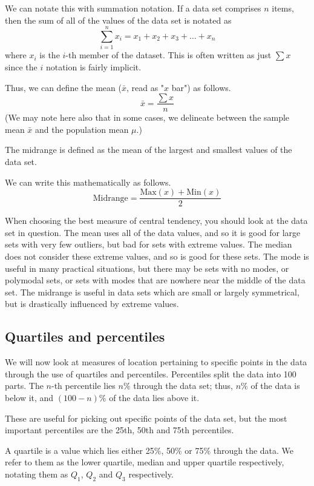We can notate this with summation notation. If a data set comprises $n$ items, then the sum of all of the values of the data set is notated as $$\sum_{i=1}^n x_i = x_1 + x_2 + x_3 + \ldots + x_n$$ where $x_i$ is the $i$-th member of the dataset. This is often written as just $\sum x$ since the $i$ notation is fairly implicit.

Thus, we can define the mean ($\bar{x}$, read as "$x$ bar") as follows. $$\bar{x}=\frac{\sum x}{n}$$ (We may note here also that in some cases, we delineate between the sample mean $\bar{x}$ and the population mean $\mu$.)

\begin{tcolorbox}
    \begin{definition}[Midrange]
        The midrange is defined as the mean of the largest and smallest values of the data set.
    \end{definition}
\end{tcolorbox}

We can write this mathematically as follows. $$\mathrm{Midrange}=\frac{\mathrm{Max}(x)+\mathrm{Min}(x)}{2}$$

When choosing the best measure of central tendency, you should look at the data set in question. The mean uses all of the data values, and so it is good for large sets with very few outliers, but bad for sets with extreme values. The median does not consider these extreme values, and so is good for these sets. The mode is useful in many practical situations, but there may be sets with no modes, or polymodal sets, or sets with modes that are nowhere near the middle of the data set. The midrange is useful in data sets which are small or largely symmetrical, but is drastically influenced by extreme values.

\subsection{Quartiles and percentiles}

We will now look at measures of location pertaining to specific points in the data through the use of quartiles and percentiles. Percentiles split the data into 100 parts. The $n$-th percentile lies $n\%$ through the data set; thus, $n\%$ of the data is below it, and $(100-n)\%$ of the data lies above it.

These are useful for picking out specific points of the data set, but the most important percentiles are the 25th, 50th and 75th percentiles.

\begin{tcolorbox}
    \begin{definition}[Quartile]
        A quartile is a value which lies either 25\%, 50\% or 75\% through the data. We refer to them as the lower quartile, median and upper quartile respectively, notating them as $Q_1$, $Q_2$ and $Q_3$ respectively.
    \end{definition}
\end{tcolorbox}

